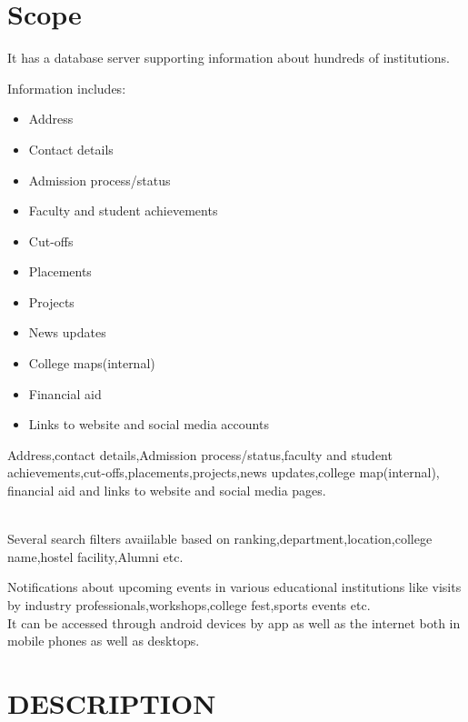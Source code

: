 \documentclass[11pt]{article}
\begin{document}
\section{Scope}
{\large It has a database server supporting information about hundreds of              institutions.}
\\ {\large Information includes:
\begin{itemize}
\item Address
\item Contact details
\item Admission process/status
\item Faculty and student achievements
\item Cut-offs
\item Placements
\item Projects
\item News updates
\item College maps(internal)
\item Financial aid
\item Links to website and social media accounts

\end{itemize}


 Address,contact details,Admission process/status,faculty and student achievements,cut-offs,placements,projects,news updates,college map(internal), financial aid and links to website and social media pages.}
\\ {\large Several search filters avaiilable based on ranking,department,location,college name,hostel facility,Alumni etc.}
\\\begin{large}
 Notifications about upcoming events in various educational institutions like visits by industry professionals,workshops,college fest,sports events etc.               
\\It can be accessed through android devices by app as well as the internet both in mobile phones as well as desktops.


\end{large}
  
\section{DESCRIPTION}
\end{document}
